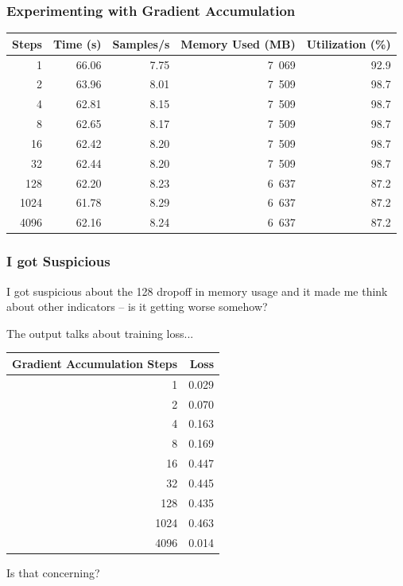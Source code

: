 \begin{frame}
\frametitle{Experimenting with Gradient Accumulation}

\begin{center}
\begin{tabular}{r|r|r|r|r}
\textbf{Steps} & \textbf{Time (s)} & \textbf{Samples/s} & \textbf{Memory Used (MB)} & \textbf{Utilization (\%)} \\ \hline
1 & 66.06 & 7.75 & 7~069 & 92.9 \\
2 & 63.96 & 8.01 & 7~509 & 98.7 \\
4 & 62.81 & 8.15 & 7~509 & 98.7 \\
8 & 62.65 & 8.17 & 7~509 & 98.7 \\
16 & 62.42 & 8.20 & 7~509 & 98.7 \\
32 & 62.44 & 8.20 & 7~509 & 98.7\\
128 & 62.20 & 8.23 & 6~637 & 87.2\\
1024 & 61.78 & 8.29 & 6~637 & 87.2 \\
4096 & 62.16 & 8.24 & 6~637 & 87.2
\end{tabular}
\end{center}

\end{frame}

\begin{frame}
\frametitle{I got Suspicious}

I got suspicious about the 128 dropoff in memory usage and it made me think about other indicators -- is it getting worse somehow? 

The output talks about training loss...

\begin{center}
\begin{tabular}{r|r}
\textbf{Gradient Accumulation Steps} & \textbf{Loss} \\ \hline
1 & 0.029 \\
2 & 0.070 \\
4 & 0.163 \\
8 & 0.169 \\
16 & 0.447 \\
32 & 0.445 \\
128 & 0.435 \\
1024 & 0.463 \\
4096 & 0.014 \\
\end{tabular}
\end{center}

Is that concerning?

\end{frame}

